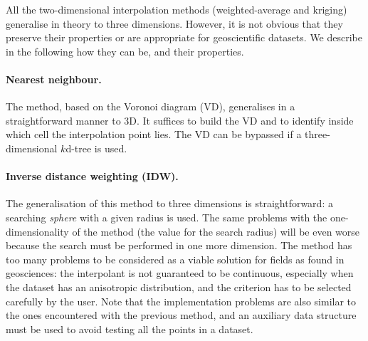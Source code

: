 All the two-dimensional interpolation methods (weighted-average and kriging) generalise in theory to three dimensions.
However, it is not obvious that they preserve their properties or are appropriate for geoscientific datasets.
We describe in the following how they can be, and their properties.

\paragraph{Nearest neighbour.} 
The method, based on the Voronoi diagram (VD),%
generalises in a straightforward manner to 3D.
It suffices to build the VD and to identify inside which cell the interpolation point lies.
The VD can be bypassed if a three-dimensional $k$d-tree is used.


\paragraph{Inverse distance weighting (\textbf{IDW}).}
The generalisation of this method to three dimensions is straightforward: a searching \emph{sphere} with a given radius is used. 
The same problems with the one-dimensionality of the method (the value for the search radius) will be even worse because the search must be performed in one more dimension. 
The method has too many problems to be considered as a viable solution for fields as found in geosciences: the interpolant is not guaranteed to be continuous, especially when the dataset has an anisotropic distribution, 
and the criterion has to be selected carefully by the user.
Note that the implementation problems are also similar to the ones encountered with the previous method, and an auxiliary data structure must be used to avoid testing all the points in a dataset.


